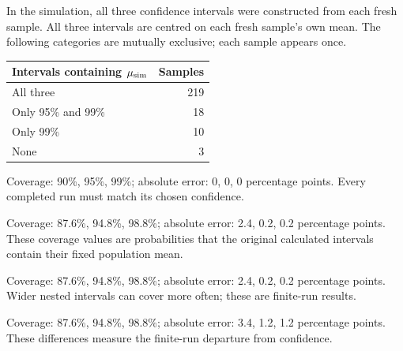 In the simulation, all three confidence intervals were constructed from each fresh sample.
All three intervals are centred on each fresh sample's own mean. The following categories are mutually exclusive; each sample appears once.
\begin{center}\begin{tabular}{@{}lr@{}}\toprule
Intervals containing $\mu_{\rm sim}$ & Samples\\\midrule
All three & 219 \\[6pt]
Only 95\% and 99\% & 18 \\[6pt]
Only 99\% & 10 \\[6pt]
None & 3 \\[6pt]
\bottomrule\end{tabular}\end{center}

\begin{answeroptions}
\item Coverage: 90\%, 95\%, 99\%; absolute error: 0, 0, 0 percentage points. Every completed run must match its chosen confidence.
\item Coverage: 87.6\%, 94.8\%, 98.8\%; absolute error: 2.4, 0.2, 0.2 percentage points. These coverage values are probabilities that the original calculated intervals contain their fixed population mean.
\item Coverage: 87.6\%, 94.8\%, 98.8\%; absolute error: 2.4, 0.2, 0.2 percentage points. Wider nested intervals can cover more often; these are finite-run results.
\item Coverage: 87.6\%, 94.8\%, 98.8\%; absolute error: 3.4, 1.2, 1.2 percentage points. These differences measure the finite-run departure from confidence.
\end{answeroptions}
\clearpage
